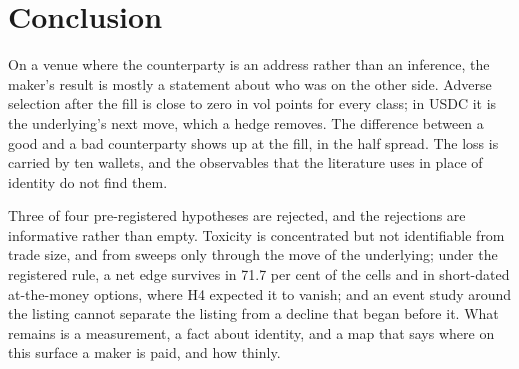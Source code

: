 \documentclass[a4paper,fleqn]{cas-dc}
\begin{document}
\section{Conclusion}\label{sec:conclusion}
On a venue where the counterparty is an address rather than an inference, the maker's result is mostly a
statement about who was on the other side. Adverse selection after the fill is close to zero in vol points
for every class; in USDC it is the underlying's next move, which a hedge removes. The difference between a good
and a bad counterparty shows up at the fill, in the half spread. The loss is carried
by ten wallets, and the observables that the literature uses in place of identity do not find them.

Three of four pre-registered hypotheses are rejected, and the rejections are informative rather than empty.
Toxicity is concentrated but not identifiable from trade size, and from sweeps only through the move of the
underlying; under the registered rule, a
net edge survives in 71.7 per cent of the cells and in short-dated at-the-money options, where H4 expected it to vanish; and an event
study around the listing cannot separate the listing from a decline that began before it. What remains is a
measurement, a fact about identity, and a map that says where on this surface a maker is paid, and how
thinly.
\end{document}
